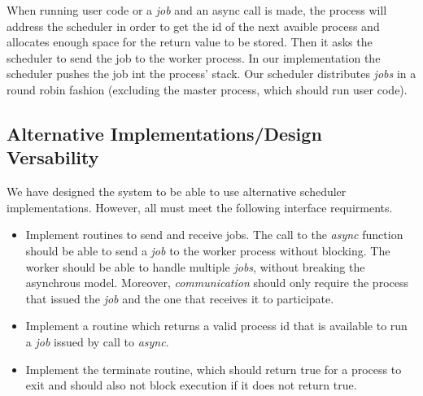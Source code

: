 When running user code or a \emph{job} and an async call is made, the process will address the scheduler in order
to get the id of the next avaible process and allocates enough space for the return value to be stored.
Then it asks the scheduler to send the job to the worker process.  In our implementation the scheduler 
pushes the job int the process' stack.  Our scheduler distributes \emph{jobs} in a round robin fashion 
(excluding the master process, which should run user code). 

\subsection{Alternative Implementations/Design Versability}

We have designed the system to be able to use alternative scheduler implementations.  However, all must meet the
following interface requirments.\\

\begin{itemize}

 \item Implement routines to send and receive jobs.  The call to the \emph{async} function should be
able to send a \emph{job} to the worker process without blocking.  The worker should be able to handle
multiple \emph{jobs}, without breaking the asynchrous model.  Moreover, \emph{communication} should only
require the process that issued the \emph{job} and the one that receives it to participate.


 \item Implement a routine which returns a valid process id that is available to run a \emph{job}
issued by call to \emph{async}.

 \item Implement the terminate routine, which should return true for a process to exit and should
also not block execution if it does not return true.

\end{itemize}
 
\vfill

